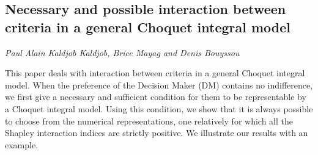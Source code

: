\documentclass[../booklet.tex]{subfiles}
\begin{document}
\subsection[Necessary and possible interaction between criteria in a general Choquet integral model. {\it Paul Alain Kaldjob Kaldjob, Brice Mayag and Denis Bouyssou}]{Necessary and possible interaction between criteria in a general Choquet integral model}
  

\begin{center}
  {\it Paul Alain Kaldjob Kaldjob, Brice Mayag and Denis Bouyssou}
\end{center}

\vskip 0.8cm


 This paper deals with interaction  between criteria in a
general Choquet integral model. When the preference of the Decision
Maker (DM) contains no indifference, we first give a necessary and
sufficient condition for them to be representable by a Choquet
integral model. Using this condition, we show that it is always
possible to choose from the numerical representations, one
relatively for which all the Shapley interaction indices are strictly
positive. We illustrate our results with an example.

\end{document}
